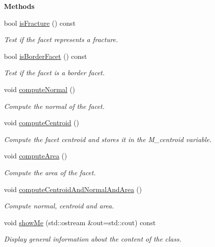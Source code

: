\begin{Indent}{\bf Methods}\par
\begin{DoxyCompactItemize}
\item 
bool \hyperlink{classFVCode3D_1_1Mesh3D_1_1Facet3D_a423c2a0166a18a17d35cfdb6a0343c5b}{is\+Fracture} () const 
\begin{DoxyCompactList}\small\item\em Test if the facet represents a fracture. \end{DoxyCompactList}\item 
bool \hyperlink{classFVCode3D_1_1Mesh3D_1_1Facet3D_a85a5f6331b71abd97a35b33518c3cbb4}{is\+Border\+Facet} () const 
\begin{DoxyCompactList}\small\item\em Test if the facet is a border facet. \end{DoxyCompactList}\item 
void \hyperlink{classFVCode3D_1_1Mesh3D_1_1Facet3D_ace915c86bf9d191e9df37c1ff77c998e}{compute\+Normal} ()
\begin{DoxyCompactList}\small\item\em Compute the normal of the facet. \end{DoxyCompactList}\item 
void \hyperlink{classFVCode3D_1_1Mesh3D_1_1Facet3D_a67899ed8ad959cf2788f011b9e87dc15}{compute\+Centroid} ()
\begin{DoxyCompactList}\small\item\em Compute the facet centroid and stores it in the M\+\_\+centroid variable. \end{DoxyCompactList}\item 
void \hyperlink{classFVCode3D_1_1Mesh3D_1_1Facet3D_add443b097967551ad360f30fc7810f43}{compute\+Area} ()
\begin{DoxyCompactList}\small\item\em Compute the area of the facet. \end{DoxyCompactList}\item 
void \hyperlink{classFVCode3D_1_1Mesh3D_1_1Facet3D_af4fe5bce97fc48c94fdcf667941c21b8}{compute\+Centroid\+And\+Normal\+And\+Area} ()
\begin{DoxyCompactList}\small\item\em Compute normal, centroid and area. \end{DoxyCompactList}\item 
void \hyperlink{classFVCode3D_1_1Mesh3D_1_1Facet3D_a8ecdf3275bf4bd6ac921f691e3746383}{show\+Me} (std\+::ostream \&out=std\+::cout) const 
\begin{DoxyCompactList}\small\item\em Display general information about the content of the class. \end{DoxyCompactList}\end{DoxyCompactItemize}
\end{Indent}
